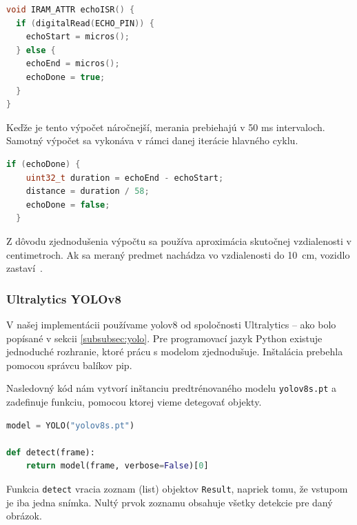 \begin{lstlisting}[language=C++, caption=Obsluha prerušenia ultrazvukového senzora]
void IRAM_ATTR echoISR() {
  if (digitalRead(ECHO_PIN)) {
    echoStart = micros();
  } else {
    echoEnd = micros();
    echoDone = true;
  }
}
\end{lstlisting}
Keďže je tento výpočet náročnejší, merania prebiehajú v 50 ms intervaloch. Samotný výpočet sa vykonáva v rámci danej iterácie hlavného cyklu.
\begin{lstlisting}[language=C++, caption=Výpočet vzdialenosti z merania ultrazvukového senzora]
  if (echoDone) {
    uint32_t duration = echoEnd - echoStart;
    distance = duration / 58;
    echoDone = false;
  }
\end{lstlisting}
Z dôvodu zjednodušenia výpočtu sa používa aproximácia skutočnej vzdialenosti v centimetroch. Ak sa meraný predmet nachádza vo vzdialenosti do 10~cm, vozidlo zastaví~\cite{hcsr04}.
\subsubsection{Ultralytics YOLOv8}
V našej implementácii používame \acrshort{yolo}v8 od spoločnosti Ultralytics -- ako bolo popísané v sekcii \ref{subsubsec:yolo}. Pre programovací jazyk Python existuje jednoduché rozhranie, ktoré prácu s modelom zjednodušuje. Inštalácia prebehla pomocou správcu balíkov pip.\par
Nasledovný kód nám vytvorí inštanciu predtrénovaného modelu \verb|yolov8s.pt| a zadefinuje funkciu, pomocou ktorej vieme detegovať objekty.\clearpage
\begin{lstlisting}[language=Python, caption=Príprava CNN na detekciu objektov]
model = YOLO("yolov8s.pt")

def detect(frame):
    return model(frame, verbose=False)[0]
\end{lstlisting}
Funkcia \verb|detect| vracia zoznam (list) objektov \verb|Result|, napriek tomu, že vstupom je iba jedna snímka. Nultý prvok zoznamu obsahuje všetky detekcie pre daný obrázok.
